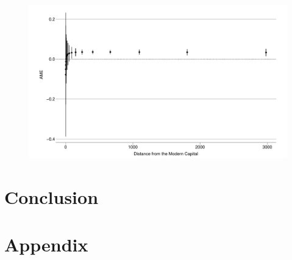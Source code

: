 \documentclass[12pt]{article}
\begin{document}
\begin{figure}[htpb]
	\centering
	\includegraphics[width=\linewidth]{"../R/Output/state_based_int_plot.pdf"}
	\caption{}
	\label{sb_int}
\end{figure}

\section{Conclusion}

\pagebreak




\pagebreak
\section*{Appendix}





\end{document}
